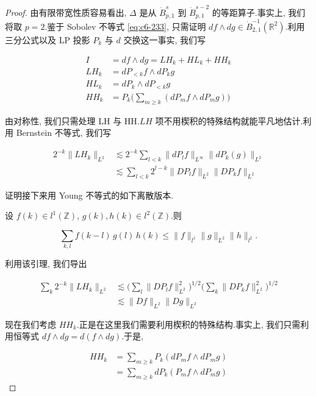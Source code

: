 \begin{proof}
由有限带宽性质容易看出, $\Delta$ 是从 $\dot{B}_{p, 1}^s$ 到 $\dot{B}_{p, 1}^{s-2}$ 的等距算子.事实上, 我们将取 $p = 2$.鉴于 Sobolev 不等式 \eqref{eq:c6-233}, 只需证明 $df \wedge dg \in \dot{B}_{2, 1}^{-1}(\mathbb{R}^2)$.利用三分公式以及 LP 投影 $P_k$ 与 $d$ 交换这一事实, 我们写

\[
\begin{aligned}
I &= df \wedge dg = LH_k + HL_k + HH_k\\
LH_k &= dP_{< k} f \wedge dP_k g\\
HL_k &= dP_k \wedge dP_{< k} g\\
HH_k &= P_k\big(\sum_{m \geq k} (dP_m f \wedge dP_m g)\big)
\end{aligned}
\]

由对称性, 我们只需处理 LH 与 HH.$LH$ 项不用楔积的特殊结构就能平凡地估计.利用 Bernstein 不等式, 我们写

\[
\begin{aligned}
2^{-k} \|LH_k\|_{L^2} &\lesssim 2^{-k} \sum_{l < k} \|dP_l f\|_{L^\infty} \|dP_k(g)\|_{L^2}\\
&\lesssim \sum_{l < k} 2^{l-k} \|DP_l f\|_{L^2} \|DP_k f\|_{L^2}
\end{aligned}
\]

证明接下来用 Young 不等式的如下离散版本.

\begin{lemma}\label{lem:c6-4.2}
设 $f(k) \in l^1(\mathbb{Z})$, $g(k), h(k) \in l^2(\mathbb{Z})$.则

\[
\sum_{k, l} f(k-l)\, g(l)\, h(k) \leq \|f\|_{l^1} \|g\|_{L^2} \|h\|_{l^2}.
\]
\end{lemma}

利用该引理, 我们导出

\[
\begin{aligned}
\sum_k 2^{-k} \|LH_k\|_{L^2} &\lesssim \big(\sum_l \|DP_l f\|_{L^2}^2\big)^{1/2} \big(\sum_k \|DP_k f\|_{L^2}^2\big)^{1/2}\\
&\lesssim \|Df\|_{L^2} \|Dg\|_{L^2}
\end{aligned}
\]

现在我们考虑 $HH_k$.正是在这里我们需要利用楔积的特殊结构.事实上, 我们只需利用恒等式 $df \wedge dg = d(f \wedge dg)$.于是,

\[
\begin{aligned}
HH_k &= \sum_{m \geq k} P_k(dP_m f \wedge dP_m g)\\
&= \sum_{m \geq k} dP_k(P_m f \wedge dP_m g)
\end{aligned}
\]


\end{proof}

